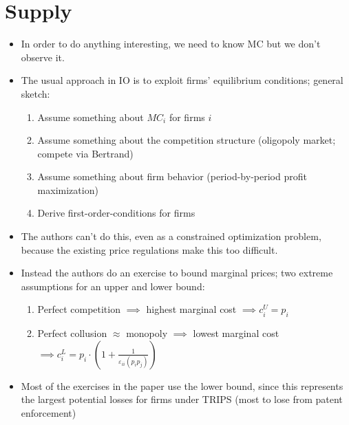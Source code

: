 \section{Supply}
\begin{itemize}
\item In order to do anything interesting, we need to know MC but we don't observe it.
\item The usual approach in IO is to exploit firms' equilibrium conditions; general sketch:
  \begin{enumerate}
  \item Assume something about $MC_i$ for firms $i$
  \item Assume something about the competition structure (oligopoly market; compete via Bertrand)
  \item Assume something about firm behavior (period-by-period profit maximization)
    \item Derive first-order-conditions for firms
  \end{enumerate}
  \item The authors can't do this, even as a constrained optimization problem, because the existing price regulations make this too difficult. 
  \item Instead the authors do an exercise to bound marginal prices; two extreme assumptions for an upper and lower bound:
    \begin{enumerate}
    \item Perfect competition $\implies$ highest marginal cost $\implies c_i^U = p_i$
      \item Perfect collusion $\approx$ monopoly $\implies$ lowest marginal cost $\implies c_i^L = p_i \cdot \left(1 + \frac{1}{\varepsilon_{ii}(p_i p_j)}\right)$
    \end{enumerate}
    \item Most of the exercises in the paper use the lower bound, since this represents the largest potential losses for firms under TRIPS (most to lose from patent enforcement)
\end{itemize}


